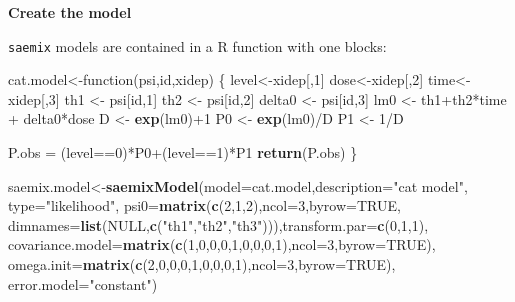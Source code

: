 \documentclass[]{book}
\newenvironment{Shaded}{\begin{snugshade}}{\end{snugshade}}
\newcommand{\KeywordTok}[1]{\textcolor[rgb]{0.13,0.29,0.53}{\textbf{{#1}}}}
\newcommand{\DataTypeTok}[1]{\textcolor[rgb]{0.13,0.29,0.53}{{#1}}}
\newcommand{\DecValTok}[1]{\textcolor[rgb]{0.00,0.00,0.81}{{#1}}}
\newcommand{\StringTok}[1]{\textcolor[rgb]{0.31,0.60,0.02}{{#1}}}
\newcommand{\OtherTok}[1]{\textcolor[rgb]{0.56,0.35,0.01}{{#1}}}
\newcommand{\NormalTok}[1]{{#1}}
\begin{document}
\textbf{Create the model}

\texttt{saemix} models are contained in a R function with one blocks:

\begin{Shaded}
\begin{Highlighting}[]
\NormalTok{cat.model<-function(psi,id,xidep) \{}
\NormalTok{level<-xidep[,}\DecValTok{1}\NormalTok{]}
\NormalTok{dose<-xidep[,}\DecValTok{2}\NormalTok{]}
\NormalTok{time<-xidep[,}\DecValTok{3}\NormalTok{]}
\NormalTok{th1 <-}\StringTok{ }\NormalTok{psi[id,}\DecValTok{1}\NormalTok{]}
\NormalTok{th2 <-}\StringTok{ }\NormalTok{psi[id,}\DecValTok{2}\NormalTok{]}
\NormalTok{delta0 <-}\StringTok{ }\NormalTok{psi[id,}\DecValTok{3}\NormalTok{]}
\NormalTok{lm0 <-}\StringTok{ }\NormalTok{th1+th2*time +}\StringTok{ }\NormalTok{delta0*dose}
\NormalTok{D <-}\StringTok{ }\KeywordTok{exp}\NormalTok{(lm0)+}\DecValTok{1}
\NormalTok{P0 <-}\StringTok{ }\KeywordTok{exp}\NormalTok{(lm0)/D}
\NormalTok{P1 <-}\StringTok{ }\DecValTok{1}\NormalTok{/D}

\NormalTok{P.obs =}\StringTok{ }\NormalTok{(level==}\DecValTok{0}\NormalTok{)*P0+(level==}\DecValTok{1}\NormalTok{)*P1}
\KeywordTok{return}\NormalTok{(P.obs) \}}

\NormalTok{saemix.model<-}\KeywordTok{saemixModel}\NormalTok{(}\DataTypeTok{model=}\NormalTok{cat.model,}\DataTypeTok{description=}\StringTok{"cat model"}\NormalTok{,}
  \DataTypeTok{type=}\StringTok{"likelihood"}\NormalTok{, }\DataTypeTok{psi0=}\KeywordTok{matrix}\NormalTok{(}\KeywordTok{c}\NormalTok{(}\DecValTok{2}\NormalTok{,}\DecValTok{1}\NormalTok{,}\DecValTok{2}\NormalTok{),}\DataTypeTok{ncol=}\DecValTok{3}\NormalTok{,}\DataTypeTok{byrow=}\OtherTok{TRUE}\NormalTok{,}
  \DataTypeTok{dimnames=}\KeywordTok{list}\NormalTok{(}\OtherTok{NULL}\NormalTok{,}\KeywordTok{c}\NormalTok{(}\StringTok{"th1"}\NormalTok{,}\StringTok{"th2"}\NormalTok{,}\StringTok{"th3"}\NormalTok{))),}\DataTypeTok{transform.par=}\KeywordTok{c}\NormalTok{(}\DecValTok{0}\NormalTok{,}\DecValTok{1}\NormalTok{,}\DecValTok{1}\NormalTok{),}
  \DataTypeTok{covariance.model=}\KeywordTok{matrix}\NormalTok{(}\KeywordTok{c}\NormalTok{(}\DecValTok{1}\NormalTok{,}\DecValTok{0}\NormalTok{,}\DecValTok{0}\NormalTok{,}\DecValTok{0}\NormalTok{,}\DecValTok{1}\NormalTok{,}\DecValTok{0}\NormalTok{,}\DecValTok{0}\NormalTok{,}\DecValTok{0}\NormalTok{,}\DecValTok{1}\NormalTok{),}\DataTypeTok{ncol=}\DecValTok{3}\NormalTok{,}\DataTypeTok{byrow=}\OtherTok{TRUE}\NormalTok{),}
  \DataTypeTok{omega.init=}\KeywordTok{matrix}\NormalTok{(}\KeywordTok{c}\NormalTok{(}\DecValTok{2}\NormalTok{,}\DecValTok{0}\NormalTok{,}\DecValTok{0}\NormalTok{,}\DecValTok{0}\NormalTok{,}\DecValTok{1}\NormalTok{,}\DecValTok{0}\NormalTok{,}\DecValTok{0}\NormalTok{,}\DecValTok{0}\NormalTok{,}\DecValTok{1}\NormalTok{),}\DataTypeTok{ncol=}\DecValTok{3}\NormalTok{,}\DataTypeTok{byrow=}\OtherTok{TRUE}\NormalTok{),}
  \DataTypeTok{error.model=}\StringTok{"constant"}\NormalTok{)}
\end{Highlighting}
\end{Shaded}
\end{document}
